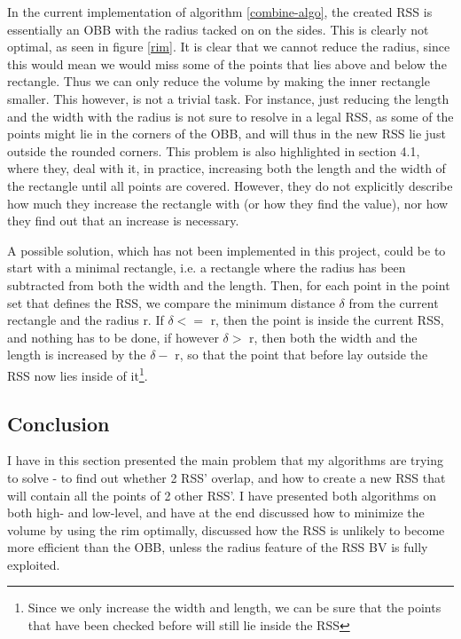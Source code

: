 In the current implementation of algorithm \ref{combine-algo}, the created RSS is essentially an OBB with the radius tacked on on the sides. This is clearly not optimal, as seen in figure \ref{rim}. It is clear that we cannot reduce the radius, since this would mean we would miss some of the points that lies above and below the rectangle. Thus we can only reduce the volume by making the inner rectangle smaller. This however, is not a trivial task. For instance, just reducing the length and the width with the radius is not sure to resolve in a legal RSS, as some of the points might lie in the corners of the OBB, and will thus in the new RSS lie just outside the rounded corners. This problem is also highlighted in \cite{Larsen99fastproximity} section 4.1, where they, deal with it, in practice, increasing both the length and the width of the rectangle until all points are covered. However, they do not explicitly describe how much they increase the rectangle with (or how they find the value), nor how they find out that an increase is necessary.

A possible solution, which has not been implemented in this project, could be to start with a minimal rectangle, i.e. a rectangle where the radius has been subtracted from both the width and the length. Then, for each point in the point set that defines the RSS, we compare the minimum distance $\delta$ from the current rectangle and the radius r. If $\delta <=$ r, then the point is inside the current RSS, and nothing has to be done, if however $\delta >$ r, then both the width and the length is increased by the $\delta -$ r, so that the point that before lay outside the RSS now lies inside of it\footnote{Since we only increase the width and length, we can be sure that the points that have been checked before will still lie inside the RSS}.
 
\subsection{Conclusion}
I have in this section presented the main problem that my algorithms are trying to solve - to find out whether 2 RSS' overlap, and how to create a new RSS that will contain all the points of 2 other RSS'. I have presented both algorithms on both high- and low-level, and have at the end discussed how to minimize the volume by using the rim optimally, discussed how the RSS is unlikely to become more efficient than the OBB, unless the radius feature of the RSS BV is fully exploited.
